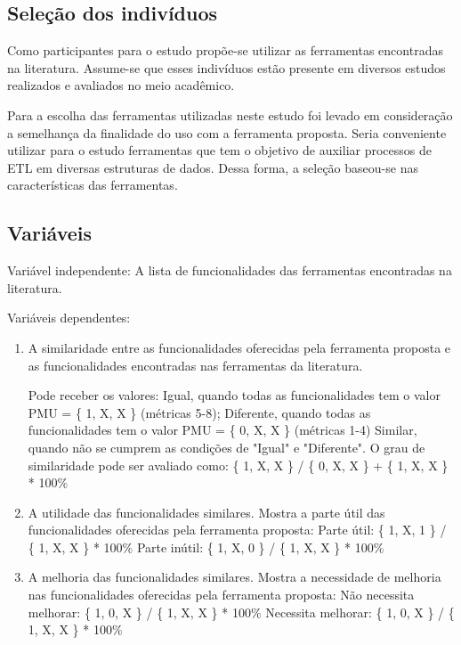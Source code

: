 \subsection{Seleção dos indivíduos}

Como participantes para o estudo propõe-se utilizar as ferramentas encontradas na literatura. Assume-se que esses indivíduos estão presente em diversos estudos realizados e avaliados no meio acadêmico.

Para a escolha das ferramentas utilizadas neste estudo foi levado em consideração a semelhança da finalidade do uso com a ferramenta proposta. Seria conveniente utilizar para o estudo ferramentas que tem o objetivo de auxiliar processos de ETL em diversas estruturas de dados. Dessa forma, a seleção baseou-se nas características das ferramentas.

\subsection{Variáveis}


Variável independente: A lista de funcionalidades das ferramentas encontradas na literatura.

Variáveis dependentes: 

\begin{enumerate}
	\item A similaridade entre as funcionalidades oferecidas pela ferramenta proposta e as funcionalidades encontradas nas ferramentas da literatura.
	
	Pode receber os valores: Igual, quando todas as funcionalidades tem o valor PMU = \{ 1, X, X \} (métricas 5-8);
	Diferente, quando todas as funcionalidades tem o valor PMU = \{ 0, X, X \} (métricas 1-4)
	Similar, quando não se cumprem as condições de "Igual" e "Diferente". O grau de similaridade pode ser avaliado como:
	\{ 1, X, X \} / \{ 0, X, X \} + \{ 1, X, X \} * 100\%
	
	\item A utilidade das funcionalidades similares. Mostra a parte útil das funcionalidades oferecidas pela ferramenta proposta:
	Parte útil: \{ 1, X, 1 \} / \{ 1, X, X \} * 100\%
	Parte inútil: \{ 1, X, 0 \} / \{ 1, X, X \} * 100\%
	
	\item A melhoria das funcionalidades similares. Mostra a necessidade de melhoria nas funcionalidades oferecidas pela ferramenta proposta:
	Não necessita melhorar: \{ 1, 0, X \} / \{ 1, X, X \} * 100\%
	Necessita melhorar: \{ 1, 0, X \} / \{ 1, X, X \} * 100\%
\end{enumerate}

